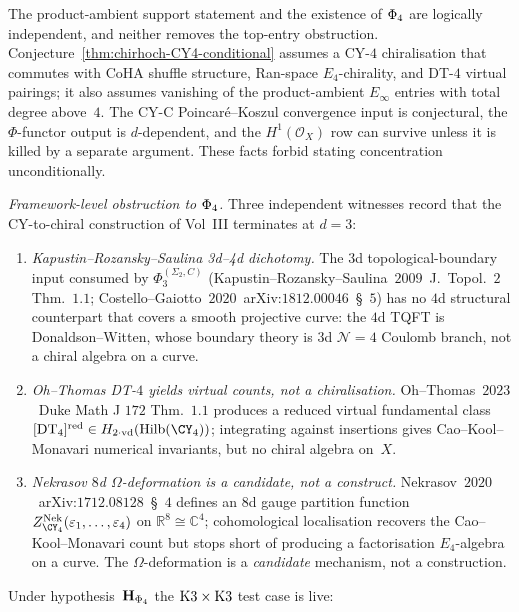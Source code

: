 \begin{remark}
\label{rem:CY4-phi4-obstruction-scope}
The product-ambient support statement and the existence of $\Phi_{4}$
are logically independent, and neither removes the top-entry
obstruction. Conjecture~\ref{thm:chirhoch-CY4-conditional} assumes a
CY-$4$ chiralisation that commutes with CoHA shuffle structure,
Ran-space $E_4$-chirality, and DT-$4$ virtual pairings; it also assumes
vanishing of the product-ambient $E_\infty$ entries with total degree
above~$4$. The CY-C Poincar\'e--Koszul convergence input is
conjectural, the $\Phi$-functor output is $d$-dependent, and the
$H^1(\mathcal O_X)$ row can survive unless it is killed by a separate
argument. These facts forbid stating concentration unconditionally.

\emph{Framework-level obstruction to $\Phi_{4}$.} Three independent
witnesses record that the CY-to-chiral construction of Vol~III
terminates at $d=3$:
\begin{enumerate}[label=\textup{(\alph*)}]
\item \emph{Kapustin--Rozansky--Saulina 3d--4d dichotomy.}
 The $3$d topological-boundary input consumed by
 $\Phi_3^{(\Sigma_2,C)}$ (Kapustin--Rozansky--Saulina~$2009$~J.\ Topol.\ $2$ Thm.\ $1.1$;
 Costello--Gaiotto~$2020$~arXiv:$1812.00046$~\S~$5$) has no
 $4$d structural counterpart that covers a smooth projective curve:
 the $4$d TQFT is Donaldson--Witten, whose boundary theory is
 $3$d $\mathcal N=4$ Coulomb branch, not a chiral algebra on a
 curve.
\item \emph{Oh--Thomas DT-$4$ yields virtual counts, not a chiralisation.}
 Oh--Thomas~$2023$~Duke Math J $172$ Thm.\ $1.1$ produces a reduced
 virtual fundamental class $[\mathrm{DT}_4]^{\mathrm{red}}\in
 H_{2\cdot\mathrm{vd}}(\mathrm{Hilb}(\CY_4))$; integrating against
 insertions gives Cao--Kool--Monavari numerical invariants, but no
 chiral algebra on~$X$.
\item \emph{Nekrasov $8$d $\Omega$-deformation is a candidate, not a
 construct.} Nekrasov~$2020$~arXiv:$1712.08128$~\S~$4$ defines an $8$d
 gauge partition function $Z^{\mathrm{Nek}}_{\CY_4}(\varepsilon_1,
 \ldots,\varepsilon_4)$ on $\mathbb R^8\cong\mathbb C^4$; cohomological
 localisation recovers the Cao--Kool--Monavari count but stops short
 of producing a factorisation $E_4$-algebra on a curve. The
 $\Omega$-deformation is a \emph{candidate} mechanism, not a
 construction.
\end{enumerate}
Under hypothesis~$\mathbf H_{\Phi_{4}}$ the $\mathrm{K3}\times\mathrm{K3}$ test case is live:

\end{remark}
